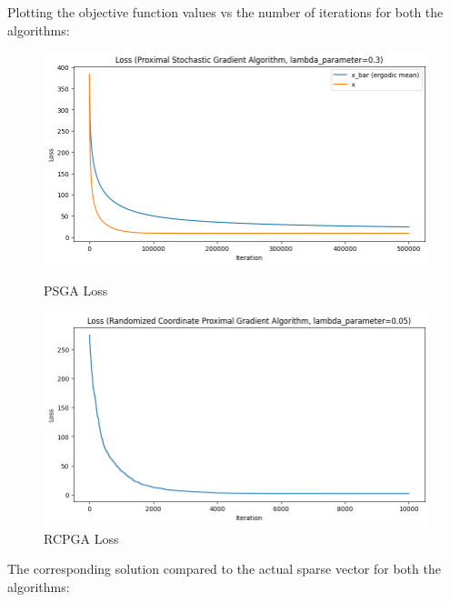 \documentclass[12pt]{article}
\begin{document}
Plotting the objective function values vs the number of iterations for both the algorithms:

\begin{figure}[h]
\centering
\begin{minipage}{.5\textwidth}
  \centering
\includegraphics[scale=0.4]{outputs/part_3/psga-loss}
\caption{PSGA Loss}
\label{fig:}
\end{minipage}%
\begin{minipage}{.5\textwidth}
  \centering
\includegraphics[scale=0.4]{outputs/part_3/rcpga-loss}
\caption{RCPGA Loss}
\label{fig:}
\end{minipage}
\end{figure}


The corresponding solution compared to the actual sparse vector for both the algorithms:
\end{document}
